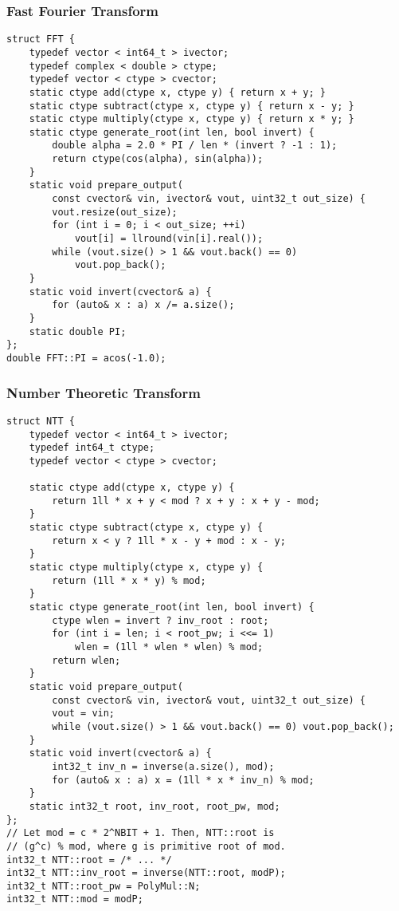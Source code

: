 \documentclass[10pt,landscape]{article}
\begin{document}
\begin{multicols}{2}
\subsubsection{Fast Fourier Transform}
\begin{lstlisting}
struct FFT {
    typedef vector < int64_t > ivector;
    typedef complex < double > ctype;
    typedef vector < ctype > cvector;
    static ctype add(ctype x, ctype y) { return x + y; }
    static ctype subtract(ctype x, ctype y) { return x - y; }
    static ctype multiply(ctype x, ctype y) { return x * y; }
    static ctype generate_root(int len, bool invert) {
        double alpha = 2.0 * PI / len * (invert ? -1 : 1);
        return ctype(cos(alpha), sin(alpha));
    }
    static void prepare_output(
        const cvector& vin, ivector& vout, uint32_t out_size) {
        vout.resize(out_size);
        for (int i = 0; i < out_size; ++i)
            vout[i] = llround(vin[i].real());
        while (vout.size() > 1 && vout.back() == 0)
            vout.pop_back();
    }
    static void invert(cvector& a) {
        for (auto& x : a) x /= a.size();
    }
    static double PI;
};
double FFT::PI = acos(-1.0);
\end{lstlisting}
\subsubsection{Number Theoretic Transform}
\begin{lstlisting}
struct NTT {
    typedef vector < int64_t > ivector;
    typedef int64_t ctype;
    typedef vector < ctype > cvector;

    static ctype add(ctype x, ctype y) { 
        return 1ll * x + y < mod ? x + y : x + y - mod;
    }
    static ctype subtract(ctype x, ctype y) { 
        return x < y ? 1ll * x - y + mod : x - y;
    }
    static ctype multiply(ctype x, ctype y) {
        return (1ll * x * y) % mod;
    }
    static ctype generate_root(int len, bool invert) {
        ctype wlen = invert ? inv_root : root;
        for (int i = len; i < root_pw; i <<= 1)
            wlen = (1ll * wlen * wlen) % mod;
        return wlen;
    }
    static void prepare_output(
        const cvector& vin, ivector& vout, uint32_t out_size) {
        vout = vin;
        while (vout.size() > 1 && vout.back() == 0) vout.pop_back();
    }
    static void invert(cvector& a) {
        int32_t inv_n = inverse(a.size(), mod);
        for (auto& x : a) x = (1ll * x * inv_n) % mod;
    }
    static int32_t root, inv_root, root_pw, mod;
};
// Let mod = c * 2^NBIT + 1. Then, NTT::root is
// (g^c) % mod, where g is primitive root of mod.
int32_t NTT::root = /* ... */
int32_t NTT::inv_root = inverse(NTT::root, modP);
int32_t NTT::root_pw = PolyMul::N;
int32_t NTT::mod = modP;
\end{lstlisting}

\end{multicols}
\end{document}
